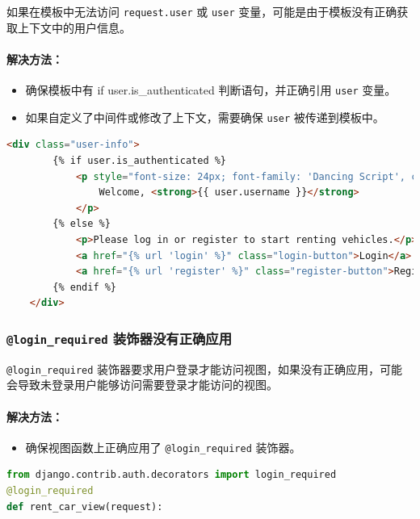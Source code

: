 \documentclass[UTF8,a4paper,12pt]{ctexart}
\begin{document}
如果在模板中无法访问 \texttt{request.user} 或 \texttt{user} 变量，可能是由于模板没有正确获取上下文中的用户信息。

\paragraph{解决方法：}
\begin{itemize}
    \item 确保模板中有 if user.is\_authenticated 判断语句，并正确引用 \texttt{user} 变量。
    \item 如果自定义了中间件或修改了上下文，需要确保 \texttt{user} 被传递到模板中。
\end{itemize}

\begin{lstlisting}[language=HTML]
    <div class="user-info">
        {% if user.is_authenticated %}
            <p style="font-size: 24px; font-family: 'Dancing Script', cursive; color: #7b1efc; font-weight: bold;">
                Welcome, <strong>{{ user.username }}</strong>
            </p>
        {% else %}
            <p>Please log in or register to start renting vehicles.</p>
            <a href="{% url 'login' %}" class="login-button">Login</a>
            <a href="{% url 'register' %}" class="register-button">Register</a>
        {% endif %}
    </div>
\end{lstlisting}

\subsubsection{\texttt{@login\_required} 装饰器没有正确应用}

\texttt{@login\_required} 装饰器要求用户登录才能访问视图，如果没有正确应用，可能会导致未登录用户能够访问需要登录才能访问的视图。

\paragraph{解决方法：}
\begin{itemize}
    \item 确保视图函数上正确应用了 \texttt{@login\_required} 装饰器。
\end{itemize}

\begin{lstlisting}[language=Python]
from django.contrib.auth.decorators import login_required  
@login_required
def rent_car_view(request):
\end{lstlisting}
\end{document}
